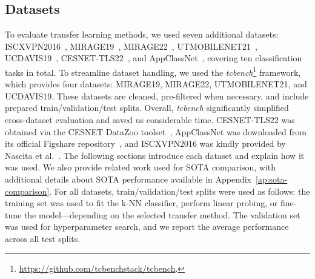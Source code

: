 \documentclass[lettersize,journal,twoside,article]{IEEEtran}
\begin{document}
\subsection{Datasets}
\label{sec:transfer-datasets}
To evaluate transfer learning methods, we used seven additional datasets: ISCXVPN2016~\cite{dataset_ISCXVPN2016}, MIRAGE19~\cite{dataset_MIRAGE19}, MIRAGE22~\cite{dataset_MIRAGE22}, UTMOBILENET21~\cite{dataset_UTMOBILENET21}, UCDAVIS19~\cite{dataset_UCDAVIS19}, CESNET-TLS22~\cite{Luxemburk2023TLS}, and AppClassNet~\cite{dataset_AppClassNet}, covering ten classification tasks in total. To streamline dataset handling, we used the \textit{tcbench}\footnote{\url{https://github.com/tcbenchstack/tcbench}.} framework, which provides four datasets: MIRAGE19, MIRAGE22, UTMOBILENET21, and UCDAVIS19. These datasets are cleaned, pre-filtered when necessary, and include prepared train/validation/test splits. Overall, \textit{tcbench} significantly simplified cross-dataset evaluation and saved us considerable time. CESNET-TLS22 was obtained via the CESNET DataZoo toolset~\cite{Luxemburk2023Datazoo}, AppClassNet was downloaded from its official Figshare repository~\cite{dataset_AppClassNet_figshare}, and ISCXVPN2016 was kindly provided by Nascita et al.~\cite{Nascita2023Embeddings}. The following sections introduce each dataset and explain how it was used. We also provide related work used for SOTA comparison, with additional details about SOTA performance available in Appendix~\ref{ap:sota-comparison}. For all datasets, train/validation/test splits were used as follows: the training set was used to fit the k-NN classifier, perform linear probing, or fine-tune the model---depending on the selected transfer method. The validation set was used for hyperparameter search, and we report the average performance across all test splits.
\end{document}
